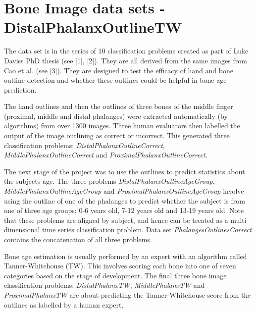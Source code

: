 \chapter{Bone Image data sets -\/ Distal\+Phalanx\+Outline\+TW}
\hypertarget{md_external_2data_2UCRArchive__2018_2DistalPhalanxTW_2README}{}\label{md_external_2data_2UCRArchive__2018_2DistalPhalanxTW_2README}
\label{md_external_2data_2UCRArchive__2018_2DistalPhalanxTW_2README_autotoc_md44}%
%
 The data set is in the series of 10 classification problems created as part of Luke Davis\textquotesingle{}s PhD thesis (see \mbox{[}1\mbox{]}, \mbox{[}2\mbox{]}). They are all derived from the same images from Cao et al. (see \mbox{[}3\mbox{]}). They are designed to test the efficacy of hand and bone outline detection and whether these outlines could be helpful in bone age prediction.

The hand outlines and then the outlines of three bones of the middle finger (proximal, middle and distal phalanges) were extracted automatically (by algorithms) from over 1300 images. Three human evaluators then labelled the output of the image outlining as correct or incorrect. This generated three classification problems\+: {\itshape Distal\+Phalanx\+Outline\+Correct}, {\itshape Middle\+Phalanx\+Outline\+Correct} and {\itshape Proximal\+Phalanx\+Outline\+Correct}.

The next stage of the project was to use the outlines to predict statistics about the subjects age. The three problems {\itshape Distal\+Phalanx\+Outline\+Age\+Group}, {\itshape Middle\+Phalanx\+Outline\+Age\+Group} and {\itshape Proximal\+Phalanx\+Outline\+Age\+Group} involve using the outline of one of the phalanges to predict whether the subject is from one of three age groups\+: 0-\/6 years old, 7-\/12 years old and 13-\/19 years old. Note that these problems are aligned by subject, and hence can be treated as a multi dimensional time series classification problem. Data set {\itshape Phalanges\+Outlines\+Correct} contains the concatenation of all three problems.

Bone age estimation is usually performed by an expert with an algorithm called Tanner-\/\+Whitehouse (TW). This involves scoring each bone into one of seven categories based on the stage of development. The final three bone image classification problems\+: {\itshape Distal\+Phalanx\+TW}, {\itshape Middle\+Phalanx\+TW} and {\itshape Proximal\+Phalanx\+TW} are about predicting the Tanner-\/\+Whitehouse score from the outlines as labelled by a human expert.

